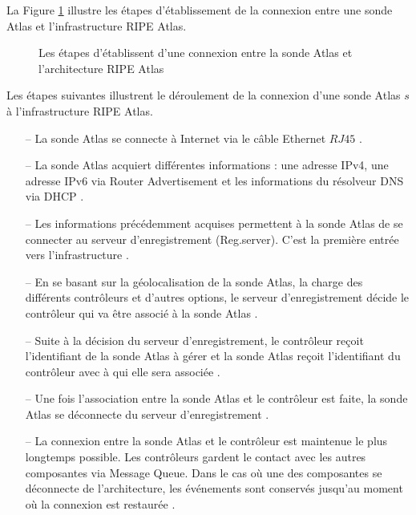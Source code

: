 La Figure \ref{fig:deroulement-connexion-ripe-atlas} illustre les étapes d'établissement de la connexion entre une sonde Atlas  et  l'infrastructure RIPE Atlas.

\begin{figure}[H]
	\captionsetup{justification=centering}
	\centering
	\resizebox{\textwidth}{!}{
		 
	}
	\caption{Les étapes d'établissent d'une connexion entre la sonde Atlas et l'architecture  RIPE Atlas}
	\label{fig:deroulement-connexion-ripe-atlas}
\end{figure}


Les étapes suivantes illustrent le déroulement de la connexion d'une sonde Atlas $s$ à l'infrastructure RIPE Atlas. 

\begin{itemize}
	\item[--] La sonde Atlas se connecte à Internet via  le câble Ethernet $RJ45$ .
	\item[--] La sonde Atlas acquiert différentes informations : une adresse IPv4, une adresse IPv6 via Router Advertisement et les informations du résolveur DNS via DHCP . 
	
	\item[--] Les informations précédemment acquises permettent à la sonde Atlas de se connecter  au serveur d'enregistrement (Reg.server). C'est la première entrée vers l'infrastructure .
	
	\item[--] En se basant sur la géolocalisation de la sonde Atlas, la charge des différents contrôleurs et d'autres options,  le serveur d'enregistrement décide le contrôleur qui va  être associé à la sonde Atlas . 
	
	\item[--] Suite à la décision du serveur d'enregistrement, le contrôleur reçoit l'identifiant de la sonde Atlas à gérer et la sonde Atlas reçoit l'identifiant du contrôleur avec à qui elle sera associée .
	
	\item[--]  Une fois l'association entre la sonde Atlas et le contrôleur est faite,  la sonde Atlas se déconnecte du serveur d'enregistrement .
	
	\item[--] La connexion entre la sonde Atlas et le contrôleur est  maintenue le plus longtemps possible. Les contrôleurs gardent le contact avec les autres composantes via Message Queue. Dans le cas où  une des composantes se déconnecte de l'architecture, les événements sont conservés jusqu'au moment où la connexion est restaurée .
	
\end{itemize}

